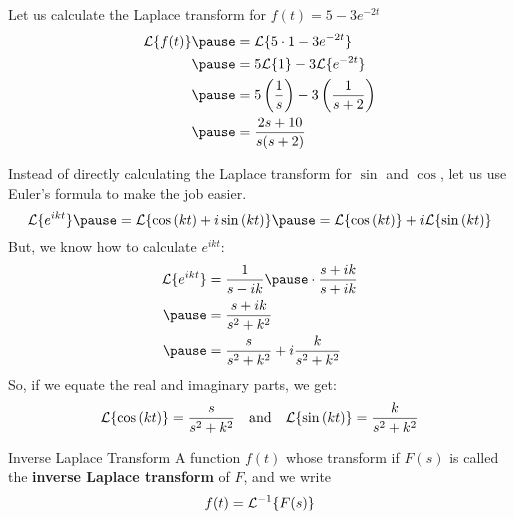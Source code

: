 \documentclass{beamer}
\begin{document}
\begin{frame}
\begin{example}
Let us calculate the Laplace transform for $f(t)=5-3 e^{-2t}$\pause
\begin{equation*}
\begin{aligned}
\laplace\{f(t)\}\pause
&=\laplace\{5\cdot 1-3 e^{-2t}\}\\\pause
&=5\laplace\{1\}-3\laplace\{e^{-2t}\}\\\pause
&=5\left(\dfrac{1}{s}\right)-3\left(\dfrac{1}{s+2}\right)\\\pause
&=\dfrac{2s+10}{s(s+2)}
\end{aligned}
\end{equation*}
\end{example}
\end{frame}

\begin{frame}
\begin{example}
Instead of directly calculating the Laplace transform for $\sin$ and $\cos$, let us use Euler's formula to make the job easier.\pause
\begin{equation*}
\laplace\{e^{ikt}\}\pause
=\laplace\{\cos[kt]+i\sin[kt]\}\pause
=\laplace\{\cos[kt]\}+i\laplace\{\sin[kt]\}
\end{equation*}\pause
But, we know how to calculate $e^{ikt}$:
\begin{equation*}
\begin{aligned}
\laplace\{e^{ikt}\}&=\dfrac{1}{s-ik}\pause
\cdot\dfrac{s+ik}{s+ik}\\\pause
&=\dfrac{s+ik}{s^2+k^2}\\\pause
&=\dfrac{s}{s^2+k^2}+i\dfrac{k}{s^2+k^2}
\end{aligned}
\end{equation*}\pause
So, if we equate the real and imaginary parts, we get:
\begin{equation*}
\laplace\{\cos[kt]\}=\dfrac{s}{s^2+k^2}
\quad\text{and}\quad
\laplace\{\sin[kt]\}=\dfrac{k}{s^2+k^2}
\end{equation*}
\end{example}
\end{frame}

\begin{frame}
\begin{block}{Inverse Laplace Transform}
A function $f(t)$ whose transform if $F(s)$ is called the \textbf{inverse Laplace transform} of $F$, and we write
\begin{equation*}
f(t)=\mathcal{L}^{-1}\{F(s)\}
\end{equation*}
\end{block}
\end{frame}
\end{document}
